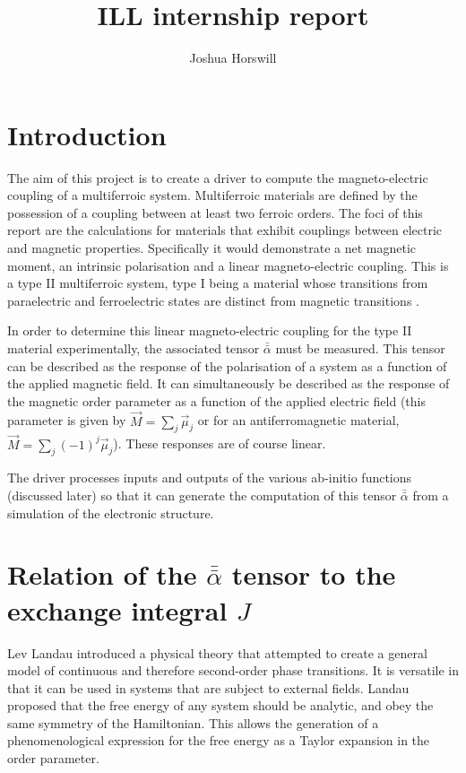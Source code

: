 \documentclass[10pt]{article}
\author{Joshua Horswill}
\title{ILL internship report}
\begin{document}
\maketitle
\tableofcontents
\section{Introduction}
The aim of this project is to create a driver to compute the magneto-electric coupling of a multiferroic system. Multiferroic materials are defined by the possession of a coupling between at least two ferroic orders. The foci of this report are the calculations for materials that exhibit couplings between electric and magnetic properties. Specifically it would demonstrate a net magnetic moment, an intrinsic polarisation and a linear magneto-electric coupling. This is a type II multiferroic system, type I being a material whose transitions from paraelectric and ferroelectric states are distinct from magnetic transitions \cite{Hur2004}\cite{goto2004ferroelectricity}.

In order to determine this linear magneto-electric coupling for the type II material experimentally, the associated tensor $\bar{\bar{\alpha}}$ must be measured. This tensor can be described as the response of the polarisation of a system as a function of the applied magnetic field. It can simultaneously be described as the response of the magnetic order parameter as a function of the applied electric field (this parameter is given by $\vec{M} = \sum_j \vec{\mu}_j$ or for an antiferromagnetic material, $\vec{M} = \sum_j (-1)^j \vec{\mu}_j$). These responses are of course linear.

The driver processes inputs and outputs of the various ab-initio functions (discussed later) so that it can generate the computation of this tensor $\bar{\bar{\alpha}}$ from a simulation of the electronic structure.

\section{Relation of the $\bar{\bar{\alpha}}$ tensor to the exchange integral $J$}

Lev Landau introduced a physical theory that attempted to create a general model of continuous and therefore second-order phase transitions. It is versatile in that it can be used in systems that are subject to external fields. Landau proposed that the free energy of any system should be analytic, and obey the same symmetry of the Hamiltonian. This allows the generation of a phenomenological expression for the free energy as a Taylor expansion in the order parameter.
\end{document}
